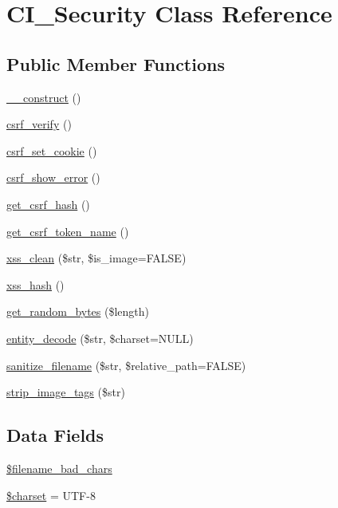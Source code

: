 \hypertarget{class_c_i___security}{}\section{C\+I\+\_\+\+Security Class Reference}
\label{class_c_i___security}
\subsection*{Public Member Functions}
\begin{DoxyCompactItemize}
\item 
\mbox{\hyperlink{class_c_i___security_a095c5d389db211932136b53f25f39685}{\+\_\+\+\_\+construct}} ()
\item 
\mbox{\hyperlink{class_c_i___security_a03c037268db0c2e6221b65a736eaee07}{csrf\+\_\+verify}} ()
\item 
\mbox{\hyperlink{class_c_i___security_a55b1380b93b71ab3d9873bb967c2b9bb}{csrf\+\_\+set\+\_\+cookie}} ()
\item 
\mbox{\hyperlink{class_c_i___security_a3d09c1dc706abfaad987661805c28a06}{csrf\+\_\+show\+\_\+error}} ()
\item 
\mbox{\hyperlink{class_c_i___security_a1644fd8967db3a1b94988d730ca34991}{get\+\_\+csrf\+\_\+hash}} ()
\item 
\mbox{\hyperlink{class_c_i___security_a00640f51b90b7d946e9d3a4f0c9f628e}{get\+\_\+csrf\+\_\+token\+\_\+name}} ()
\item 
\mbox{\hyperlink{class_c_i___security_acb759426dbab128d3d8164805225381c}{xss\+\_\+clean}} (\$str, \$is\+\_\+image=F\+A\+L\+SE)
\item 
\mbox{\hyperlink{class_c_i___security_ae2f831d3f277e1c03730b28fd1734186}{xss\+\_\+hash}} ()
\item 
\mbox{\hyperlink{class_c_i___security_a7d1d64e6798b98cb46fcdb304a4e1de2}{get\+\_\+random\+\_\+bytes}} (\$length)
\item 
\mbox{\hyperlink{class_c_i___security_a8bec9918f4d35c9e6340e1dc6a32ba14}{entity\+\_\+decode}} (\$str, \$charset=N\+U\+LL)
\item 
\mbox{\hyperlink{class_c_i___security_aaba16489285496bdc03fd12f699a08f6}{sanitize\+\_\+filename}} (\$str, \$relative\+\_\+path=F\+A\+L\+SE)
\item 
\mbox{\hyperlink{class_c_i___security_abb836a42971c7bc641588db779c6ab1d}{strip\+\_\+image\+\_\+tags}} (\$str)
\end{DoxyCompactItemize}
\subsection*{Data Fields}
\begin{DoxyCompactItemize}
\item 
\mbox{\hyperlink{class_c_i___security_a7ea55abf18a7d5ed32df02a8144b72e2}{\$filename\+\_\+bad\+\_\+chars}}
\item 
\mbox{\hyperlink{class_c_i___security_af10158dd74b75f1d337e83102d6b82ce}{\$charset}} = \textquotesingle{}U\+TF-\/8\textquotesingle{}
\end{DoxyCompactItemize}

